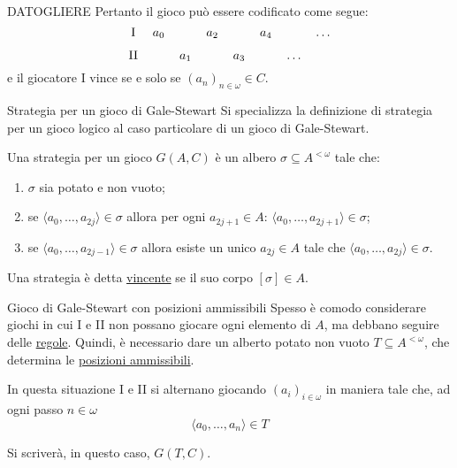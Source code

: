 \documentclass[babel]{beamer}
\renewcommand{\href}[2]{#2}
\begin{document}
\begin{frame}[label={sec:orgbd541f3}]{DATOGLIERE}
Pertanto il gioco può essere codificato come segue:
\begin{equation*}
\begin{tikzcd}[ampersand replacement=\&,cramped,sep=tiny]
	{\text{I}} \& {a_0} \&\& {a_2} \&\& {a_4} \&\& \dots \\
	{\text{II}} \&\& {a_1} \&\& {a_3} \&\& \dots
\end{tikzcd}
\end{equation*}
e il giocatore I vince se e solo se \((a_{n})_{n \in \omega} \in C\).
\end{frame}
\begin{frame}[label={sec:org46289cb}]{Strategia per un gioco di Gale-Stewart}
Si specializza la definizione di \href{../../../../../../../org/roam/20250513155732-logic_game.org}{strategia per un gioco logico} al caso particolare di un gioco di Gale-Stewart.

Una strategia per un gioco \(G(A,C)\) è un \href{../../../../../../../org/roam/20250514142154-albero_teoria_descrittiva_degli_insiemi.org}{albero} \(\sigma \subseteq A^{<\omega}\) tale che:
\begin{enumerate}
\item \(\sigma\) sia \href{../../../../../../../org/roam/20250514142208-albero_potato.org}{potato} e non vuoto;

\item se \(\langle a_{0},\dots,a_{2j}\rangle \in \sigma\) allora per ogni \(a_{2j+1} \in A\): \(\langle a_{0},\dots,a_{2j+1}\rangle \in \sigma\);

\item se \(\langle a_{0},\dots,a_{2j-1}\rangle \in \sigma\) allora esiste un unico \(a_{2j} \in A\) tale che \(\langle a_{0},\dots,a_{2j}\rangle \in \sigma\).
\end{enumerate}

Una strategia è detta \uline{vincente} se il suo \href{../../../../../../../org/roam/20250514142251-corpo_di_un_albero.org}{corpo} \([\sigma] \in A\).
\end{frame}
\begin{frame}[label={sec:orgaf782d8}]{Gioco di Gale-Stewart con posizioni ammissibili}
Spesso è comodo considerare giochi in cui I e II non possano giocare ogni elemento di \(A\), ma debbano seguire delle \uline{regole}. Quindi, è necessario dare un alberto potato non vuoto \(T \subseteq A^{<\omega}\), che determina le \href{../../../../../../../org/roam/20250514142938-posizioni_ammissibili_in_un_gioco_logico.org}{\uline{posizioni ammissibili}}.

In questa situazione I e II si alternano giocando \((a_{i})_{i \in \omega}\) in maniera tale che, ad ogni passo \(n \in \omega\)
\begin{equation*}
\langle a_{0},\dots,a_{n}\rangle \in T
\end{equation*}

Si scriverà, in questo caso, \(G(T, C)\).
\end{frame}
\end{document}
